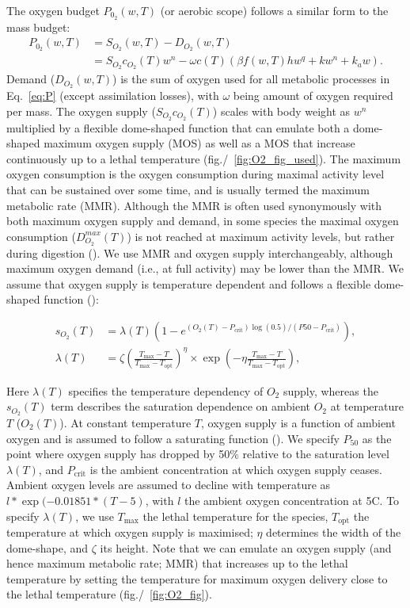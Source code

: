 \documentclass[11pt]{article}\usepackage[]{graphicx}\usepackage[]{color}
\begin{document}
The oxygen budget $P_{0_2}(w,T)$ (or aerobic scope) follows a similar form to the mass budget:
\begin{align}
  P_{0_2}(w,T) &= S_{O_2}(w,T) - D_{O_2}(w,T) \\
        &= S_{O_2}c_{O_2}(T) w^n - \omega c(T) \left( \beta f(w,T) h w^q + k w^n + k_a w \right).
\end{align}
Demand ($D_{O_2}(w,T)$) is the sum of oxygen used for all metabolic processes in Eq.~\ref{eq:P} (except assimilation losses), with $\omega$ being amount of oxygen required per mass.  The oxygen supply ($S_{O_2}c_{O_2}(T)$) scales with body weight as $w^n$ multiplied by a flexible dome-shaped function that can emulate both a dome-shaped maximum oxygen supply (MOS) as well as a MOS that increase continuously up to a lethal temperature (fig./~\ref{fig:O2_fig_used}). The maximum oxygen consumption is the oxygen consumption during maximal activity level that can be sustained over some time, and is usually termed the maximum metabolic rate (MMR). Although the MMR is often used synonymously with both maximum oxygen supply and demand, in some species the maximal oxygen consumption ($D^{max}_{O_2}(T)$) is not reached at maximum activity levels, but rather during digestion (\cite{priede_metabolic_1985}). We use MMR and oxygen supply interchangeably, although maximum oxygen demand (i.e., at full activity) may be lower than the MMR. We assume that oxygen supply is temperature dependent and follows a flexible dome-shaped function (\cite{gnauck2013freshwater, lefrancois_influence_2003}):

\begin{align}
s_{O_2}(T)&=\lambda(T)\left(1-e^{(O_2(T)-P_{\text{crit}})\log(0.5)/(P\text{50}-P_{\text{crit}})}\right),\\
\lambda(T)&=\zeta\left(\frac{T_{\text{max}}-T}{T_{\text{max}}-T_{\text{opt}}}\right)^\eta \times \exp\left(-\eta\frac{T_{\text{max}}-T}{T_{\text{max}}-T_{\text{opt}}}\right),
\end{align}

Here $\lambda(T)$ specifies the temperature dependency of $O_2$ supply, whereas the $s_{O_2}(T)$ term describes the saturation dependence on ambient $O_2$ at temperature $T$ ($O_2(T)$). At constant temperature $T$, oxygen supply is a function of ambient oxygen and is assumed to follow a saturating function (\cite[e.g.,][]{lefrancois_influence_2003}). We specify $P_{50}$ as the point where oxygen supply has dropped by 50\% relative to the saturation level $\lambda(T)$, and $P_{\text{crit}}$ is the ambient concentration at which oxygen supply ceases. Ambient oxygen levels are assumed to decline with temperature as $l*\exp(-0.01851*(T-5)$, with $l$ the ambient oxygen concentration at 5\degree C. To specify $\lambda(T)$, we use $T_{\text{max}}$ the lethal temperature for the species, $T_{\text{opt}}$ the temperature at which oxygen supply is maximised; $\eta$ determines the width of the dome-shape, and $\zeta$ its height. Note that we can emulate an oxygen supply (and hence maximum metabolic rate; MMR) that increases up to the lethal temperature by setting the temperature for maximum oxygen delivery close to the lethal temperature (fig./~\ref{fig:O2_fig}).
\end{document}
